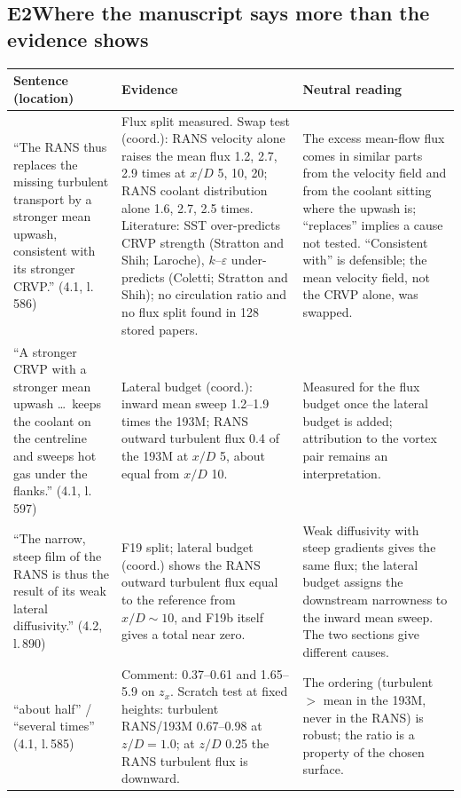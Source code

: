 \documentclass[10pt]{article}
\begin{document}
\subsection*{E2\quad Where the manuscript says more than the evidence shows}

{\footnotesize
\begin{longtable}{@{}L{4.6cm} L{6.6cm} L{5.4cm}@{}}
\toprule
Sentence (location) & Evidence & Neutral reading \\
\midrule
\endhead
``The RANS thus replaces the missing turbulent transport by a stronger mean upwash, consistent with its stronger
CRVP.'' (4.1, l.\,586) & Flux split measured. Swap test (coord.): RANS velocity alone raises the mean flux 1.2,
2.7, 2.9 times at $x/D$ 5, 10, 20; RANS coolant distribution alone 1.6, 2.7, 2.5 times. Literature: SST
over-predicts CRVP strength (Stratton and Shih; Laroche), $k$--$\varepsilon$ under-predicts (Coletti; Stratton and
Shih); no circulation ratio and no flux split found in 128 stored papers. & The excess mean-flow flux comes in
similar parts from the velocity field and from the coolant sitting where the upwash is; ``replaces'' implies a
cause not tested. ``Consistent with'' is defensible; the mean velocity field, not the CRVP alone, was swapped. \\
``A stronger CRVP with a stronger mean upwash \dots\ keeps the coolant on the centreline and sweeps hot gas under
the flanks.'' (4.1, l.\,597) & Lateral budget (coord.): inward mean sweep 1.2--1.9 times the 193M; RANS outward
turbulent flux 0.4 of the 193M at $x/D$ 5, about equal from $x/D$ 10. & Measured for the flux budget once the
lateral budget is added; attribution to the vortex pair remains an interpretation. \\
``The narrow, steep film of the RANS is thus the result of its weak lateral diffusivity.'' (4.2, l.\,890) & F19
split; lateral budget (coord.) shows the RANS outward turbulent flux equal to the reference from $x/D\sim10$, and
F19b itself gives a total near zero. & Weak diffusivity with steep gradients gives the same flux; the lateral
budget assigns the downstream narrowness to the inward mean sweep. The two sections give different causes. \\
``about half'' / ``several times'' (4.1, l.\,585) & Comment: 0.37--0.61 and 1.65--5.9 on $z_x$. Scratch test at
fixed heights: turbulent RANS/193M 0.67--0.98 at $z/D=1.0$; at $z/D$ 0.25 the RANS turbulent flux is
downward. & The ordering (turbulent $>$ mean in
the 193M, never in the RANS) is robust; the ratio is a property of the chosen surface. \\

\end{longtable}}
\end{document}
